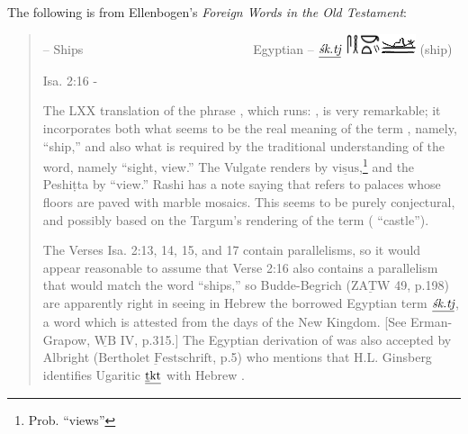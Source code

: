 The following is from Ellenbogen's \emph{Foreign Words in the Old Testament}:
\begin{quotation}
    {\noindent{} -- Ships~~~~~~~~~~~~~~~~~~~~~~~~~~~Egyptian -- $\underline{\emph{\'sk.tj}}$ \includegraphics[scale=1.1]{images/egt-ship} (ship)}
    
    {\noindent Isa. 2:16 -}
    
    The LXX translation of the phrase , which runs: , is very remarkable; it incorporates both what seems to be the real meaning of the term , namely,  ``ship,'' and also what is required by the traditional understanding of the word, namely  ``sight, view.'' The Vulgate renders  by $\underline{\text{visus}}$,\footnote{Prob. ``views''} and the Peshi\d{t}ta by  ``view.'' Rashi has a note saying that  refers to palaces whose floors are paved with marble mosaics. This seems to be purely conjectural, and possibly based on the Targum's rendering of the term ( ``castle'').
    
    The Verses Isa. 2:13, 14, 15, and 17 contain parallelisms, so it would appear reasonable to assume that Verse 2:16 also contains a parallelism that would match the word  ``ships,'' so Budde-Begrich ($\underline{\text{ZATW}}$ 49, p.198) are apparently right in seeing in Hebrew  the borrowed Egyptian term $\underline{\emph{\'sk.tj}}$, a word which is attested from the days of the New Kingdom. [See Erman-Grapow, $\underline{\text{WB}}$ IV, p.315.] The Egyptian derivation of  was also accepted by Albright ($\underline{\text{Bertholet Festschrift}}$, p.5) who mentions that H.L. Ginsberg identifies Ugaritic $\underline{\text{\underline{t}kt}}$ with Hebrew .
\end{quotation}
